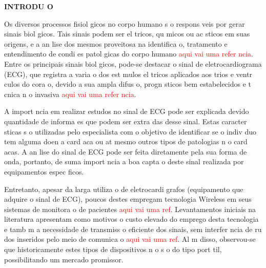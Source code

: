 \documentclass{article}
\renewcommand{\headrulewidth}{0pt}
\begin{document}
\pagestyle{myheadings}

\newpage
\vspace*{4cm}




\setcounter{page}{12}
\begin{center}
\textbf{INTRODU O\\}
\end{center}
\par
{}	

	Os diversos processos fisiol gicos no corpo humano s o respons veis por gerar sinais biol gicos. Tais sinais podem ser el tricos, qu micos ou ac sticos em suas origens, e a an lise dos mesmos   proveitosa na identifica o, tratamento e entendimento de condi es patol gicas do corpo humano \textcolor{red}{aqui vai uma refer ncia}. Entre os principais sinais biol gicos, pode-se destacar o sinal de eletrocardiograma (ECG), que registra a varia o dos est mulos el tricos aplicados aos  trios e ventr culos do cora o, devido a sua ampla difus o, progn sticos bem estabelecidos e t cnica n o invasiva \textcolor{red}{aqui vai uma refer ncia}.

	A import ncia em realizar estudos no sinal de ECG pode ser explicada devido   quantidade de informa es que podem ser extra das desse sinal. Estas caracter sticas s o utilizadas pelo especialista com o objetivo de identificar se o indiv duo tem alguma doen a card aca ou at  mesmo outros tipos de patologias n o card acas. A an lise do sinal de ECG pode ser feita diretamente pela sua forma de onda, portanto,   de suma import ncia a boa capta o deste sinal realizada por equipamentos espec ficos. 

	Entretanto, apesar da larga utiliza o de eletrocardi grafos (equipamento que adquire o sinal de ECG), poucos destes empregam tecnologia Wireless em seus sistemas de monitora o de pacientes \textcolor{red}{aqui vai uma ref}. Levantamentos iniciais na literatura apresentam como motivos o custo elevado do emprego desta tecnologia e tamb m a necessidade de transmiss o eficiente dos sinais, sem interfer ncia de ru dos inseridos pelo meio de comunica o \textcolor{red}{aqui vai uma ref}. Al m disso, observou-se que historicamente estes tipos de dispositivos n o s o do tipo port til, possibilitando um mercado promissor. 
    
\end{document}
